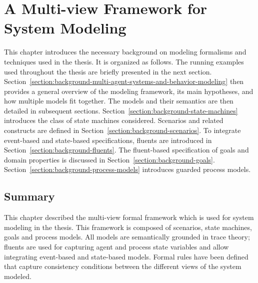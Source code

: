 \chapter{A Multi-view Framework for System Modeling\label{chapter:framework}}

This chapter introduces the necessary background on modeling formalisms and techniques used in the thesis. It is organized as follows. The running examples used throughout the thesis are briefly presented in the next section. Section~\ref{section:background-multi-agent-systems-and-behavior-modeling} then provides a general overview of the modeling framework, its main hypotheses, and how multiple models fit together. The models and their semantics are then detailed in subsequent sections. Section~\ref{section:background-state-machines} introduces the class of state machines considered. Scenarios and related constructs are defined in Section~\ref{section:background-scenarios}. To integrate event-based and state-based specifications, fluents are introduced in Section~\ref{section:background-fluents}. The fluent-based specification of goals and domain properties is discussed in Section~\ref{section:background-goals}. Section~\ref{section:background-process-models} introduces guarded process models.









\section*{Summary}

This chapter described the multi-view formal framework which is used for system modeling in the thesis. This framework is composed of scenarios, state machines, goals and process models. All models are semantically grounded in trace theory; fluents are used for capturing agent and process state variables and allow integrating event-based and state-based models. Formal rules have been defined that capture consistency conditions between the different views of the system modeled.
